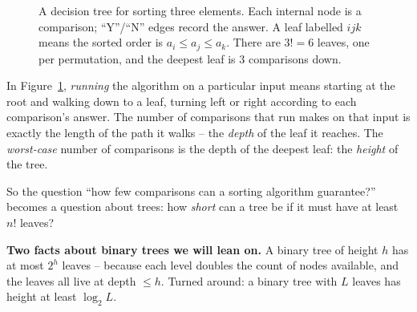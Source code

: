 \begin{figure}[H]
\centering
{}
\caption{A decision tree for sorting three elements. Each internal node is a
comparison; ``Y''/``N'' edges record the answer. A leaf labelled $ijk$ means
the sorted order is $a_i \le a_j \le a_k$. There are $3! = 6$ leaves, one per
permutation, and the deepest leaf is $3$ comparisons down.}
\label{ch08:decision-tree}
\end{figure}

In Figure~\ref{ch08:decision-tree}, \emph{running} the algorithm
on a particular input means starting at the root and walking down to a leaf,
turning left or right according to each comparison's answer. The number of
comparisons that run makes on that input is exactly the length of the path it
walks -- the \emph{depth} of the leaf it reaches. The \emph{worst-case} number
of comparisons is the depth of the deepest leaf: the \emph{height} of the tree.

So the question ``how few comparisons can a sorting algorithm guarantee?''
becomes a question about trees: how \emph{short} can a tree be if it must have
at least $n!$ leaves?

\begin{formalbox}
\textbf{Two facts about binary trees we will lean on.}
A binary tree of height $h$ has at most $2^h$ leaves -- because each level
doubles the count of nodes available, and the leaves all live at depth $\le h$.
Turned around: a binary tree with $L$ leaves has height at least $\log_2 L$.
\end{formalbox}

